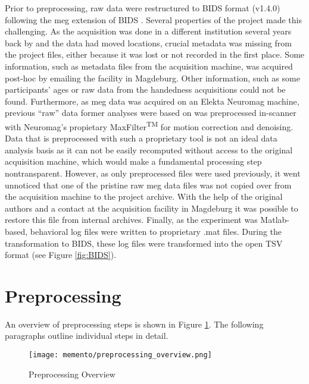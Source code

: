 Prior to preprocessing, raw data were restructured to \gls{BIDS} format (v1.4.0) following the \gls{meg} extension of \gls{BIDS} \citep{niso2018meg}.
Several properties of the project made this challenging.
As the acquisition was done in a different institution several years back by \citet{kaiser} and the data had moved locations, crucial metadata was missing from the project files, either because it was lost or not recorded in the first place.
Some information, such as metadata files from the acquisition machine, was acquired post-hoc by emailing the facility in Magdeburg.
Other information, such as some participants' ages or raw data from the handedness acquisitions could not be found.
Furthermore, as \gls{meg} data was acquired on an Elekta Neuromag machine, previous ``raw'' data former analyses were based on was preprocessed in-scanner with Neuromag's propietary MaxFilter\textsuperscript{TM} for motion correction and denoising.
Data that is preprocessed with such a proprietary tool is not an ideal data analysis basis as it can not be easily recomputed without access to the original acquisition machine, which would make a fundamental processing step nontransparent.
However, as only preprocessed files were used previously, it went unnoticed that one of the pristine raw \gls{meg} data files was not copied over from the acquisition machine to the project archive.
With the help of the original authors and a contact at the acquisition facility in Magdeburg it was possible to restore this file from internal archives.
Finally, as the experiment was Matlab-based, behavioral log files were written to proprietary .mat files.
During the transformation to \gls{BIDS}, these log files were transformed into the open TSV format (see Figure \ref{fig:BIDS}).

\section{Preprocessing}
\label{preprocessing}

An overview of preprocessing steps is shown in Figure \ref{fig:preproc}.
The following paragraphs outline individual steps in detail.

\begin{figure}[H]
	\centering
	\texttt{[image: memento/preprocessing\_overview.png]}
	\caption[Preprocessing overview]{Preprocessing Overview}
	\label{fig:preproc}
\end{figure}

